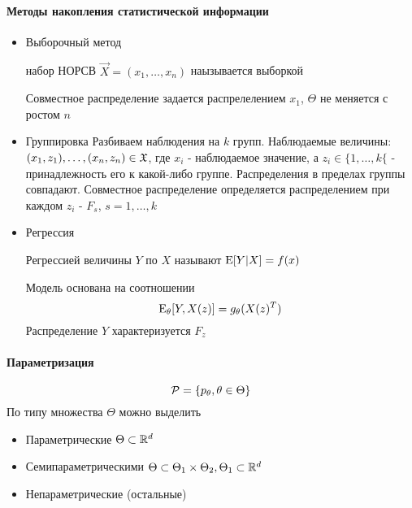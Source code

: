 \documentclass[main.tex]{subfiles}
\begin{document}
\paragraph{Методы накопления статистической информации}
\begin{itemize}
	\item Выборочный метод
	\begin{definition}[Выборка]
		набор НОРСВ $\vec{X}=(x_1,\dots,x_n)$ наызывается выборкой
	\end{definition}
	Совместное распределение задается распрелелением $x_1$,  $\Theta$ не меняется с ростом $n$
	\item Группировка\newline
	Разбиваем наблюдения на $k$ групп. Наблюдаемые величины: $(x_1,z_1),\dots,(x_n,z_n)\in\mathfrak{X}$, где $x_i$ - наблюдаемое значение, а $z_i \in \{1,\dots,k\{$ - принадлежность его к какой-либо группе. Распределения в пределах группы совпадают. Совместное распределение определяется распределением при каждом $z_i$ - $F_s$, $s=1,\dots,k$
	\item Регрессия
	\begin{definition}[Регрессия]
		Регрессией величины $Y$ по $X$ называют $\mathrm{E}[Y|X]=f(x)$
	\end{definition}
	Модель основана на соотношении $$\mathrm{E}_\theta[Y,X(z)]=g_\theta(X(z)^T)$$
	Распределение $Y$ характеризуется $F_z$

\end{itemize}

\paragraph{Параметризация}
$$\mathcal{P}=\{p_\theta,\theta\in\Theta\}$$
По типу множества $\Theta$ можно выделить
\begin{itemize}
	\item Параметрические $\Theta \subset \mathbb{R}^d$
	\item Семипараметрическими $\Theta \subset \Theta_1\times\Theta_2, \Theta_1\subset\mathbb{R}^d$
	\item Непараметрические (остальные)
\end{itemize}
\end{document}
